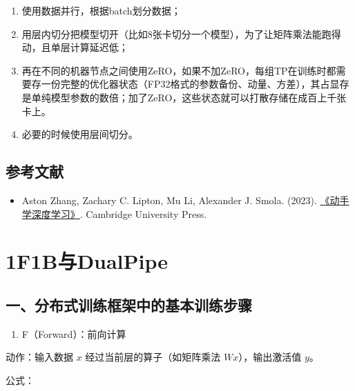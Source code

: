 \begin{enumerate}
\def\labelenumi{\arabic{enumi}.}
\item
  使用数据并行，根据batch划分数据；
\item
  用层内切分把模型切开（比如8张卡切分一个模型），为了让矩阵乘法能跑得动，且单层计算延迟低；
\item
  再在不同的机器节点之间使用ZeRO，如果不加ZeRO，每组TP在训练时都需要存一份完整的优化器状态（FP32格式的参数备份、动量、方差），其占显存是单纯模型参数的数倍；加了ZeRO，这些状态就可以打散存储在成百上千张卡上。
\item
  必要的时候使用层间切分。
\end{enumerate}

\hypertarget{ux53c2ux8003ux6587ux732e-34}{%
\subsection{参考文献}\label{ux53c2ux8003ux6587ux732e-34}}

\begin{itemize}
\tightlist
\item
  Aston Zhang, Zachary C. Lipton, Mu Li, Alexander J. Smola. (2023). \href{https://zh.d2l.ai/}{《动手学深度学习》}. Cambridge University Press.
\end{itemize}

\clearpage

\hypertarget{f1bux4e0edualpipe}{%
\section{1F1B与DualPipe}\label{f1bux4e0edualpipe}}

\hypertarget{ux4e00ux5206ux5e03ux5f0fux8badux7ec3ux6846ux67b6ux4e2dux7684ux57faux672cux8badux7ec3ux6b65ux9aa4}{%
\subsection{一、分布式训练框架中的基本训练步骤}\label{ux4e00ux5206ux5e03ux5f0fux8badux7ec3ux6846ux67b6ux4e2dux7684ux57faux672cux8badux7ec3ux6b65ux9aa4}}

\begin{enumerate}
\def\labelenumi{\arabic{enumi}.}
\tightlist
\item
  F（Forward）：前向计算
\end{enumerate}

动作：输入数据 \(x\) 经过当前层的算子（如矩阵乘法 \(Wx\)），输出激活值 \(y\)。

公式：

